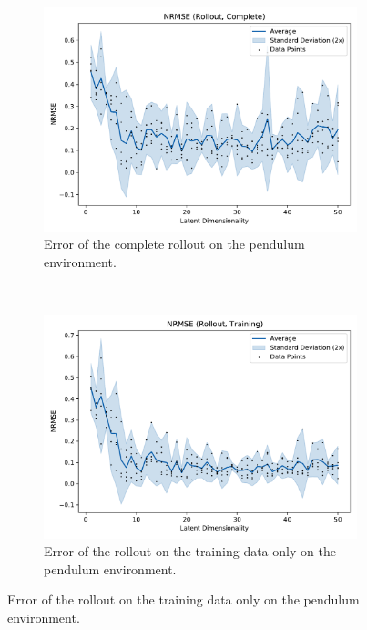 			\begin{figure}
				\centering
				\begin{subfigure}{0.7\linewidth}
					\centering
					\includegraphics[width=\linewidth]{figures/results/pendulum/latent-dim/comparison-rmse-rollout-normalized-mean-vs-latent-dim.pdf}
					\caption{Error of the complete rollout on the pendulum environment.}
					\label{fig:pendulumRmseComplete}
				\end{subfigure} \\
				\begin{subfigure}{0.5\linewidth}
					\centering
					\includegraphics[width=\linewidth]{figures/results/pendulum/latent-dim/comparison-rmse-rollout-train-normalized-mean-vs-latent-dim.pdf}
					\caption{Error of the rollout on the training data only on the pendulum environment.}

\end{subfigure}
\end{figure}
